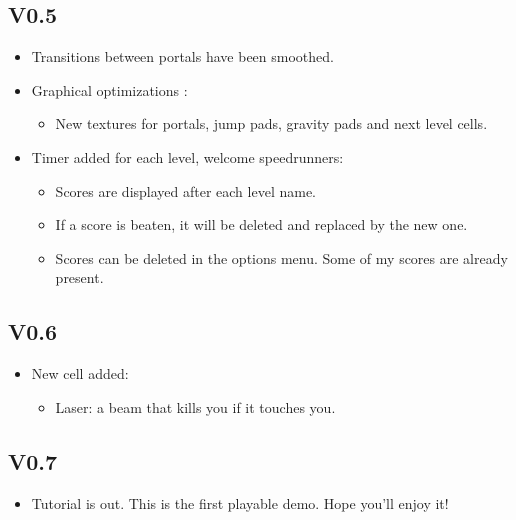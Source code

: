 \documentclass[a4paper,12pt]{article}
\begin{document}
\subsection*{V0.5}
\begin{itemize}
\item Transitions between portals have been smoothed.
\item Graphical optimizations :
\begin{itemize}
\item New textures for portals, jump pads, gravity pads and next level cells.
\end{itemize}
\item Timer added for each level, welcome speedrunners:
\begin{itemize}
\item Scores are displayed after each level name.
\item If a score is beaten, it will be deleted and replaced by the new one.
\item Scores can be deleted in the options menu. Some of my scores are already present.
\end{itemize}
\end{itemize}
\subsection*{V0.6}
\begin{itemize}
\item New cell added:
\begin{itemize}
\item Laser: a beam that kills you if it touches you.
\end{itemize}
\end{itemize}
\subsection*{V0.7}
\begin{itemize}
\item Tutorial is out. This is the first playable demo. Hope you'll enjoy it!
\end{itemize}
\end{document}
